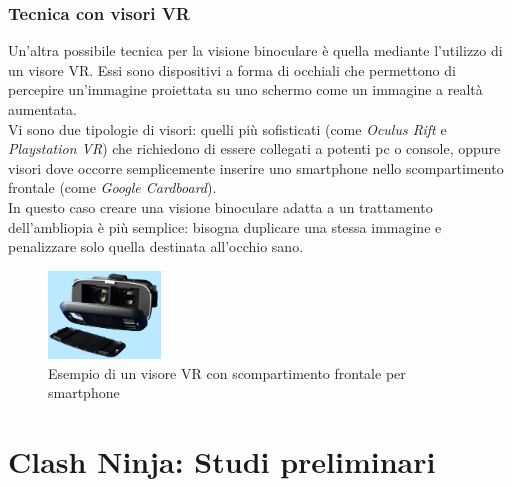 \documentclass[12pt,a4paper,openright,twoside]{book}
\begin{document}
	\subsection{Tecnica con visori VR}
	Un'altra possibile tecnica per la visione binoculare è quella mediante l'utilizzo di un visore VR. Essi sono dispositivi a forma di occhiali che permettono di percepire un'immagine proiettata su uno schermo come un immagine a realtà aumentata.\\
	Vi sono due tipologie di visori: quelli più sofisticati (come \textit{Oculus Rift} e \textit{Playstation VR}) che richiedono di essere collegati a potenti pc o console, oppure visori dove occorre semplicemente inserire uno smartphone nello scompartimento frontale (come \textit{Google Cardboard}).\\
	In questo caso creare una visione binoculare adatta a un trattamento dell'ambliopia è più semplice: bisogna duplicare una stessa immagine e penalizzare solo quella destinata all'occhio sano.
	\begin{figure}[h]
		\centering   	
		\includegraphics[width=30mm]{visorevr.jpg}
		\caption{Esempio di un visore VR con scompartimento frontale per smartphone}
		\label{fig:headsetvr}
	\end{figure}
	\chapter{Clash Ninja: Studi preliminari}
\end{document}
